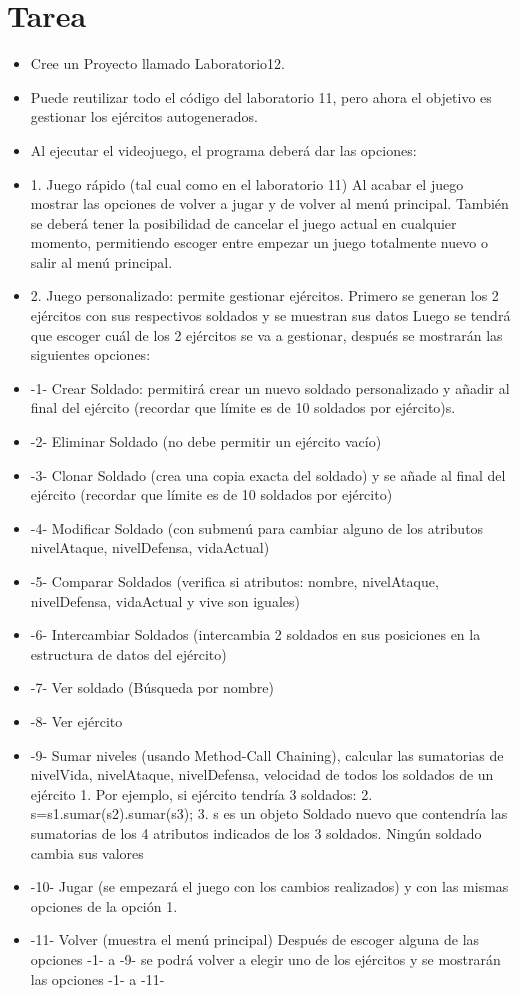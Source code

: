 \documentclass{article}
\begin{document}
	\section{Tarea}
	\begin{itemize}		
        \item Cree un Proyecto llamado Laboratorio12.
        \item Puede reutilizar todo el código del laboratorio 11, pero ahora el objetivo es gestionar los ejércitos autogenerados.
        \item Al ejecutar el videojuego, el programa deberá dar las opciones:
        \item 1. Juego rápido (tal cual como en el laboratorio 11) Al acabar el juego mostrar las opciones de volver a jugar y de volver al	menú principal. También se deberá tener la posibilidad de cancelar el juego actual en cualquier momento, permitiendo escoger entre empezar un juego totalmente nuevo o salir al menú principal.
        \item 2. Juego personalizado: permite gestionar ejércitos. Primero se generan los 2 ejércitos con sus respectivos soldados y se muestran sus datos	Luego se tendrá que escoger cuál de los 2 ejércitos se va a gestionar, después se mostrarán las siguientes opciones:
		\item -1- Crear Soldado: permitirá crear un nuevo soldado personalizado y añadir al final del ejército (recordar que límite es de 10 soldados por ejército)s.
		\item -2- Eliminar Soldado (no debe permitir un ejército vacío)
		\item -3- Clonar Soldado (crea una copia exacta del soldado) y se añade al final del ejército (recordar que límite es de 10 soldados por ejército)
		\item -4- Modificar Soldado (con submenú para cambiar alguno de los	atributos nivelAtaque, nivelDefensa, vidaActual)
		\item -5- Comparar Soldados (verifica si atributos: nombre, nivelAtaque, nivelDefensa, vidaActual y vive son iguales)
		\item -6- Intercambiar Soldados (intercambia 2 soldados en sus posiciones en la estructura de datos del ejército)
		\item -7- Ver soldado (Búsqueda por nombre)
		\item -8- Ver ejército
		\item -9- Sumar niveles (usando Method-Call Chaining), calcular las sumatorias de nivelVida, nivelAtaque, nivelDefensa, velocidad de todos los soldados de un ejército 1. Por ejemplo, si ejército tendría 3 soldados:
		2. s=s1.sumar(s2).sumar(s3);
		3. s es un objeto Soldado nuevo que contendría las
		sumatorias de los 4 atributos indicados de los 3 soldados.
		Ningún soldado cambia sus valores
		\item -10- Jugar (se empezará el juego con los cambios realizados) y con las mismas opciones de la opción 1.
		\item -11- Volver (muestra el menú principal) Después de escoger alguna de las opciones -1- a -9- se podrá volver a elegir uno de los ejércitos y se mostrarán las opciones -1- a -11-
		\end{itemize}
\end{document}
